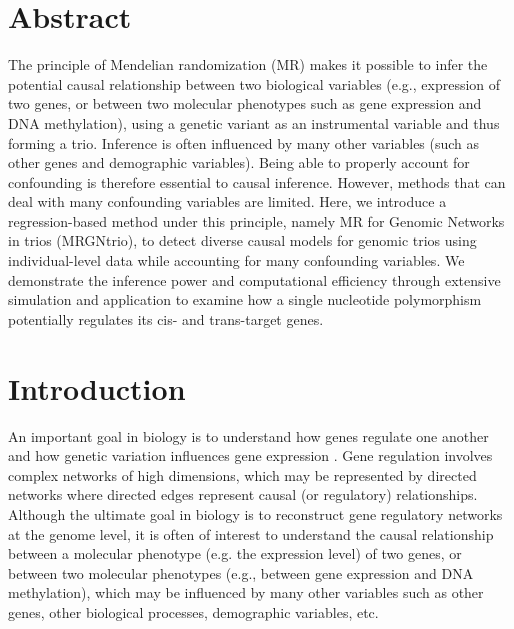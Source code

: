 \documentclass[12pt,letterpaper]{report}
\begin{document}
\begin{doublespace}

\section*{Abstract}
The principle of Mendelian randomization (MR) makes it possible to infer the potential causal relationship between two biological variables (e.g., expression of two genes, or between two molecular phenotypes such as gene expression and DNA methylation), using a genetic variant as an instrumental variable and thus forming a trio.  Inference is often influenced by many other variables (such as other genes and demographic variables).  Being able to properly account for confounding is therefore essential to causal inference.  However,  methods that can deal with many confounding variables are limited.  Here, we introduce a regression-based method under this principle, namely MR for Genomic Networks in trios (MRGNtrio), to detect diverse causal models for genomic trios using individual-level data while accounting for many confounding variables.  
We demonstrate the inference power and computational efficiency through extensive simulation and application to examine how a single nucleotide polymorphism potentially regulates its cis- and trans-target genes.

\setcounter{section}{0}
\section{Introduction}

An important goal in biology is to understand how genes regulate one another and how genetic variation influences gene expression \cite{camacho2018next, lecca2021machine, xu2019machine, pingault2018using}. Gene regulation involves complex networks of high dimensions, which may be represented by directed networks where directed edges represent causal (or regulatory) relationships. Although the ultimate goal in biology is to reconstruct gene regulatory networks at the genome level, it is often of interest to understand the causal relationship between a molecular phenotype (e.g. the expression level) of two genes, or between two molecular phenotypes (e.g., between gene expression and DNA methylation), which may be influenced by many other variables such as other genes, other biological processes, demographic variables, etc.


\end{doublespace}
\end{document}
